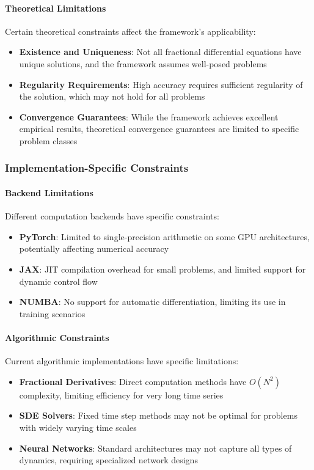 \paragraph{Theoretical Limitations}
Certain theoretical constraints affect the framework's applicability:

\begin{itemize}
    \item \textbf{Existence and Uniqueness}: Not all fractional differential equations have unique solutions, and the framework assumes well-posed problems
    \item \textbf{Regularity Requirements}: High accuracy requires sufficient regularity of the solution, which may not hold for all problems
    \item \textbf{Convergence Guarantees}: While the framework achieves excellent empirical results, theoretical convergence guarantees are limited to specific problem classes
\end{itemize}

\subsubsection{Implementation-Specific Constraints}

\paragraph{Backend Limitations}
Different computation backends have specific constraints:

\begin{itemize}
    \item \textbf{PyTorch}: Limited to single-precision arithmetic on some GPU architectures, potentially affecting numerical accuracy
    \item \textbf{JAX}: JIT compilation overhead for small problems, and limited support for dynamic control flow
    \item \textbf{NUMBA}: No support for automatic differentiation, limiting its use in training scenarios
\end{itemize}

\paragraph{Algorithmic Constraints}
Current algorithmic implementations have specific limitations:

\begin{itemize}
    \item \textbf{Fractional Derivatives}: Direct computation methods have $O(N^2)$ complexity, limiting efficiency for very long time series
    \item \textbf{SDE Solvers}: Fixed time step methods may not be optimal for problems with widely varying time scales
    \item \textbf{Neural Networks}: Standard architectures may not capture all types of dynamics, requiring specialized network designs
\end{itemize}

